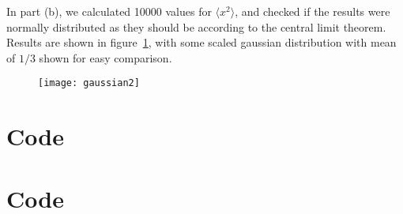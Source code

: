 \documentclass[a4paper,12pt]{scrartcl}
\begin{document}
In part (b), we calculated 10000 values for $\langle x^2 \rangle$, and checked if the results were normally distributed as they should be according to the central limit theorem. Results are shown in figure~\ref{fig:gaussian2}, with some scaled gaussian distribution with mean of $1/3$ shown for easy comparison.
\begin{figure}[h!]
  \centering
    \texttt{[image: gaussian2]}
  \caption{}
 \label{fig:gaussian2}
\end{figure}

\appendix
\lstset{basicstyle=\ttfamily, numbers=left, numberstyle=\tiny, stepnumber=1, numbersep=5pt}
\gdef\thesection{Appendix \arabic{section}.}
\clearpage

\section{Code\label{LiiteA}}

\clearpage
\section{Code\label{LiiteB}}

\clearpage

\end{document}
